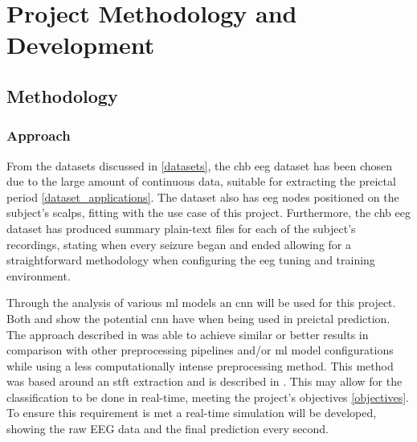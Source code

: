 \documentclass[12pt]{article}
\begin{document}
\section{Project Methodology and Development}\label{development}

\subsection{Methodology}

\subsubsection{Approach}

From the datasets discussed in \ref{datasets}, the \acrfull{chb} \acrshort{eeg} dataset has been chosen due to the large amount of continuous data, suitable for extracting the preictal period \ref{dataset_applications}. The dataset also has \acrshort{eeg} nodes positioned on the subject's scalps, fitting with the use case of this project. Furthermore, the \acrshort{chb} \acrshort{eeg} dataset has produced summary plain-text files for each of the subject's recordings, stating when every seizure began and ended allowing for a straightforward methodology when configuring the \acrshort{eeg} tuning and training environment.

Through the analysis of various \acrshort{ml} models an \acrshort{cnn} will be used for this project. Both \cite{truong2018convolutional} and \cite{mirowski2009classification} show the potential \acrshort{cnn} have when being used in preictal prediction. The approach described in \cite{truong2018convolutional} was able to achieve similar or better results in comparison with other preprocessing pipelines and/or \acrshort{ml} model configurations while using a less computationally intense preprocessing method. This method was based around an \acrshort{stft} extraction and is described in \cite{truong2018convolutional}. This may allow for the classification to be done in real-time, meeting the project's objectives \ref{objectives}. To ensure this requirement is met a real-time simulation will be developed, showing the raw EEG data and the final prediction every second.
\end{document}
